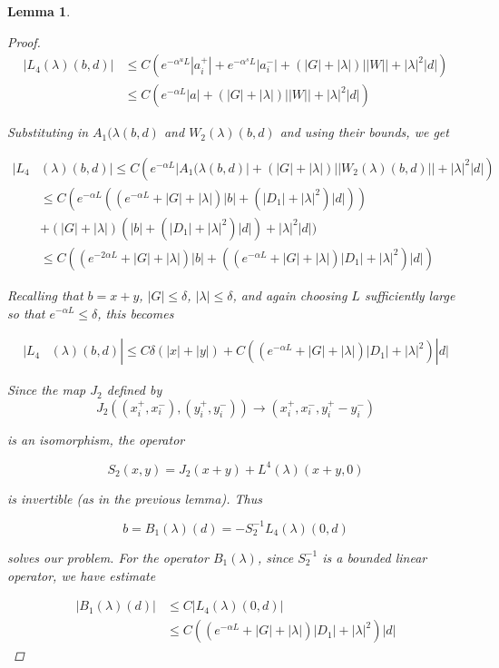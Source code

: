 \documentclass[12pt]{article}
\newtheorem{lemma}{Lemma}
\begin{document}
\begin{lemma}
\begin{proof}
\begin{align*}
|L_4(\lambda)(b,d)| &\leq C\left( e^{-\alpha^u L}|a_i^+| +  e^{-\alpha^s L}|a_i^-|
+ (|G| + |\lambda|)||W|| + |\lambda|^2|d| \right) \\
&\leq C\left( e^{-\alpha L}|a|
+ (|G| + |\lambda|)||W|| + |\lambda|^2|d| \right)
\end{align*}

Substituting in $A_1(\lambda(b,d)$ and $W_2(\lambda)(b,d)$ and using their bounds, we get

\begin{align*}
|L_4&(\lambda)(b,d)| \leq C\left( e^{-\alpha L}|A_1(\lambda(b,d)|
+ (|G| + |\lambda|)||W_2(\lambda)(b,d)|| + |\lambda|^2|d| \right) \\
&\leq C( e^{-\alpha L}((e^{-\alpha L} + |G| + |\lambda|)|b| + (|D_1| + |\lambda|^2)|d| )) \\
&+ (|G| + |\lambda|)(|b| + (|D_1| + |\lambda|^2)|d|) + |\lambda|^2|d| ) \\
&\leq C( (e^{-2 \alpha L} + |G| + |\lambda|)|b| + ((e^{-\alpha L} + |G| + |\lambda|)|D_1| + |\lambda|^2)|d|)
\end{align*}

Recalling that $b = x + y$, $|G| \leq \delta$, $|\lambda| \leq \delta$, and again choosing $L$ sufficiently large so that $e^{-\alpha L} \leq \delta$, this becomes

\begin{align*}
|L_4&(\lambda)(b,d)| \leq C\delta(|x| + |y|) + C((e^{-\alpha L} + |G| + |\lambda|)|D_1| + |\lambda|^2)|d|
\end{align*}

Since the map $J_2$ defined by
\[
J_2( (x_i^+, x_i^-),(y_i^+, y_i^-)) \rightarrow ( x_i^+, x_i^-, y_i^+ -  y_i^- )
\]

is an isomorphism, the operator

\[
S_2(x,y) = J_2(x+y) + L^4(\lambda)(x+y,0)
\]

is invertible (as in the previous lemma). Thus

\[
b = B_1(\lambda)(d) = -S_2^{-1}L_4(\lambda)(0,d)
\]

solves our problem. For the operator $B_1(\lambda)$, since $S_2^{-1}$ is a bounded linear operator, we have estimate

\begin{align*}
|B_1(\lambda)(d)| &\leq C |L_4(\lambda)(0,d)| \\
&\leq C((e^{-\alpha L} + |G| + |\lambda|)|D_1| + |\lambda|^2)|d|
\end{align*}


\end{proof}
\end{lemma}
\end{document}
